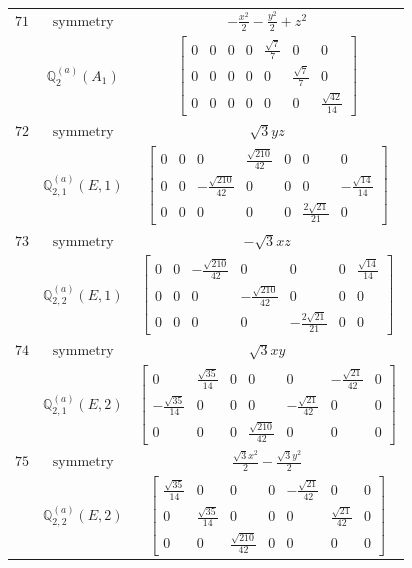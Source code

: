 \documentclass[fleqn,8pt,landscape]{jsarticle}
\begin{document}
\begin{longtable}{ccc}
$ 71 $ & $ \text{symmetry} $ & $ - \frac{x^{2}}{2} - \frac{y^{2}}{2} + z^{2} $ \\
$  $ & $ \mathbb{Q}_{2}^{(a)}(A_{1}) $ & $ \begin{bmatrix} 0 & 0 & 0 & 0 & \frac{\sqrt{7}}{7} & 0 & 0 \\ 0 & 0 & 0 & 0 & 0 & \frac{\sqrt{7}}{7} & 0 \\ 0 & 0 & 0 & 0 & 0 & 0 & \frac{\sqrt{42}}{14} \end{bmatrix} $ \\ \hline
$ 72 $ & $ \text{symmetry} $ & $ \sqrt{3} y z $ \\
$  $ & $ \mathbb{Q}_{2,1}^{(a)}(E,1) $ & $ \begin{bmatrix} 0 & 0 & 0 & \frac{\sqrt{210}}{42} & 0 & 0 & 0 \\ 0 & 0 & - \frac{\sqrt{210}}{42} & 0 & 0 & 0 & - \frac{\sqrt{14}}{14} \\ 0 & 0 & 0 & 0 & 0 & \frac{2 \sqrt{21}}{21} & 0 \end{bmatrix} $ \\ \hline
$ 73 $ & $ \text{symmetry} $ & $ - \sqrt{3} x z $ \\
$  $ & $ \mathbb{Q}_{2,2}^{(a)}(E,1) $ & $ \begin{bmatrix} 0 & 0 & - \frac{\sqrt{210}}{42} & 0 & 0 & 0 & \frac{\sqrt{14}}{14} \\ 0 & 0 & 0 & - \frac{\sqrt{210}}{42} & 0 & 0 & 0 \\ 0 & 0 & 0 & 0 & - \frac{2 \sqrt{21}}{21} & 0 & 0 \end{bmatrix} $ \\ \hline
$ 74 $ & $ \text{symmetry} $ & $ \sqrt{3} x y $ \\
$  $ & $ \mathbb{Q}_{2,1}^{(a)}(E,2) $ & $ \begin{bmatrix} 0 & \frac{\sqrt{35}}{14} & 0 & 0 & 0 & - \frac{\sqrt{21}}{42} & 0 \\ - \frac{\sqrt{35}}{14} & 0 & 0 & 0 & - \frac{\sqrt{21}}{42} & 0 & 0 \\ 0 & 0 & 0 & \frac{\sqrt{210}}{42} & 0 & 0 & 0 \end{bmatrix} $ \\ \hline
$ 75 $ & $ \text{symmetry} $ & $ \frac{\sqrt{3} x^{2}}{2} - \frac{\sqrt{3} y^{2}}{2} $ \\
$  $ & $ \mathbb{Q}_{2,2}^{(a)}(E,2) $ & $ \begin{bmatrix} \frac{\sqrt{35}}{14} & 0 & 0 & 0 & - \frac{\sqrt{21}}{42} & 0 & 0 \\ 0 & \frac{\sqrt{35}}{14} & 0 & 0 & 0 & \frac{\sqrt{21}}{42} & 0 \\ 0 & 0 & \frac{\sqrt{210}}{42} & 0 & 0 & 0 & 0 \end{bmatrix} $ \\ \hline

\end{longtable}
\end{document}
